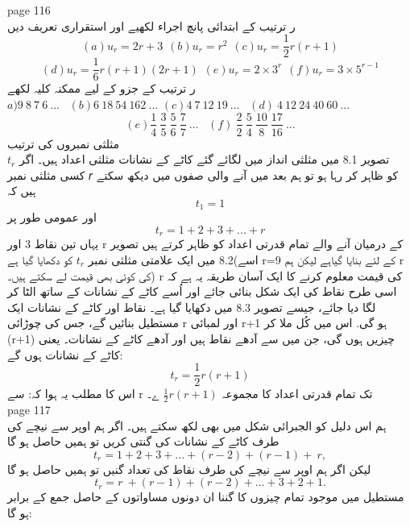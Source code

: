 page 116\\
ر ترتیب کے ابتدائی پانچ اجراء لکھیے اور استقراری تعریف دیں \\
\[(a) u_{r} = 2r + 3  \hspace{5pt} (b) u_{r} = r^{2} \hspace{5pt} (c) u_{r} = \frac{1}{2}r(r  +  1)  \]  
\[(d) u_{r} = \frac{1}{6}r(r+1)(2r+1)  \hspace{5pt} (e) u_{r} = 2 \times 3^{r}  \hspace{5pt} (f) u_{r} = 3 \times 5^{r-1}\]
ر ترتیب کے جزو کے لیے ممکنہ کلیہ لکھے \\
\(a) 9 \: 8 \: 7 \: 6 \: ... \hspace{10pt} (b) 6 \: 18 \: 54 \: 162 \: ... \)
\((c) 4 \: 7 \: 12 \: 19 \: ... \hspace{10pt} (d)\ 4 \: 12 \: 24 \: 40 \: 60 \: ...\)
\[(e)\frac{1}{4} \: \frac{3}{5} \: \frac{5}{6} \: \frac{7}{7} \: ...\hspace{10pt} (f)\ \frac{2}{2} \: \frac{5}{4} \: \frac{10}{8} \: \frac{17}{16} \: ...\]
مثلثی نمبروں کی ترتیب\\
تصویر 8.1 میں مثلثی انداز میں لگائے گئے کاٹے کے نشانات مثلثی اعداد ہیں۔ اگر
\(t_{r}\)
کسی مثلثی نمبر 𝑟 کو ظاہر کر رہا ہو تو ہم بعد میں آنے والی صفوں میں دیکھ سکتے ہیں کہ
\[t_{1}=1\]
اور عمومی طور پر
\[t_{r}=1+2+3+ ... + r\]
یہاں تین نقاط
3
اور
r
کے درمیان آنے والے تمام قدرتی اعداد کو ظاہر کرتے ہیں
تصویر 8.2 میں ایک علامتی مثلثی نمبر 
\(t_{r}\)
کو دکھایا گیا ہے(اسے r=9 کے لئے بنایا گیاہے لیکن ہم r کی کوئی بھی قیمت لے سکتے ہیں۔)
r
کی قیمت معلوم کرنے کا ایک آسان طریقہ یہ ہے کہ اسی طرح نقاط کی ایک شکل بنائی جائے اور اُسے کاٹے کے نشانات کے ساتھ الٹا کر لگا دیا جائے، جیسے تصویر 8.3 میں دکھایا گیا ہے۔ نقاط اور کاٹے کے نشانات ایک مستطیل بنائیں گے، جس کی چوڑائی
r
اور لمبائی 
r+1
ہو گی.
اس میں کُل ملا کر 
(r+1)
چیزیں ہوں گی، جن میں سے آدھے نقاط ہیں اور آدھے کاٹے کے نشانات۔ یعنی کاٹے کے نشانات ہوں گے:
\[t_{r}=\frac{1}{2}r(r+1)\]
اس کا مطلب یہ ہوا کہ:
سے
r
تک تمام قدرتی اعداد کا مجموعہ 
\(\frac{1}{2}r(r+1)\)
ے۔\\
\clearpage
page 117\\
ہم اس دلیل کو الجبرائی شکل میں بھی لکھ سکتے ہیں۔ اگر ہم اوپر سے نیچے کی طرف کاٹے کے نشانات کی گنتی کریں تو ہمیں حاصل ہو گا\\
\[ t_{r} =  1 +  2  +  3  +  ... + (r - 2) + (r - 1) + \: r ,\]
لیکن اگر ہم اوپر سے نیچے کی طرف نقاط کی تعداد گنیں تو ہمیں حاصل ہو گا\\
\[t_{r} = r \: + (r - 1) + (r - 2) + ...  + 3 + 2 + 1.\]
مستطیل میں موجود تمام چیزوں کا گننا ان دونوں مساواتوں کے حاصل جمع کے برابر ہو گا:\\
